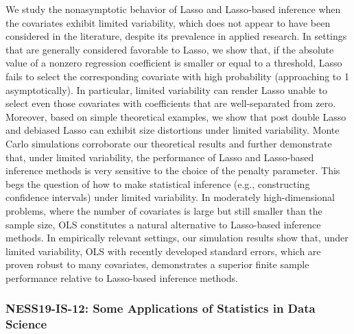 \begin{itemize}
We study the nonasymptotic behavior of Lasso and Lasso-based inference when the covariates exhibit limited variability, which does not appear to have been considered in the literature, despite its prevalence in applied research. In settings that are generally considered favorable to Lasso, we show that, if the absolute value of a nonzero regression coefficient is smaller or equal to a threshold, Lasso fails to select the corresponding covariate with high probability (approaching to 1 asymptotically). In particular, limited variability can render Lasso unable to select even those covariates with coefficients that are well-separated from zero. Moreover, based on simple theoretical examples, we show that post double Lasso and debiased Lasso can exhibit size distortions under limited variability. Monte Carlo simulations corroborate our theoretical results and further demonstrate that, under limited variability, the performance of Lasso and Lasso-based inference methods is very sensitive to the choice of the penalty parameter. This begs the question of how to make statistical inference (e.g., constructing confidence intervals) under limited variability. In moderately high-dimensional problems, where the number of covariates is large but still smaller than the sample size, OLS constitutes a natural alternative to Lasso-based inference methods. In empirically relevant settings, our simulation results show that, under limited variability, OLS with recently developed standard errors, which are proven robust to many covariates, demonstrates a superior finite sample performance relative to Lasso-based inference methods.

\end{itemize}

\subsubsection*{NESS19-IS-12: Some Applications of Statistics in Data Science}

